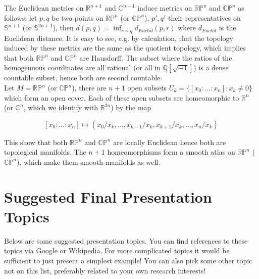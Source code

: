 \documentclass{article}
\theoremstyle{definition}
\begin{document}
The Euclidean metrics on $\mathbb{R}^{n+1}$ and $\mathbb{C}^{n+1}$ induce metrics on $\mathbb{RP}^n$ and $\mathbb{CP}^n$ as follows: let $p, q$ be two points on $\mathbb{RP}^n$ (or $\mathbb{CP}^n$), $p', q'$ their representatives on $\mathbb{S}^{n+1}$ (or $\mathbb{S}^{2n+1}$), then $d(p, q)=\inf_{r\sim q}d_{Euclid}(p, r)$ where $d_{Euclid}$ is the Euclidean distance. It is easy to see, e.g. by calculation, that the topology induced by these metrics are the same as the quotient topology, which implies that both $\mathbb{RP}^n$ and $\mathbb{CP}^n$ are Hausdorff. The subset where the ratios of the homogenuous coordinates are all rational (or all in $\mathbb{Q}[\sqrt{-1}]$) is a dense countable subset, hence both are second countable.\\

Let $M=\mathbb{RP}^n$ (or $\mathbb{CP}^n$), there are $n+1$ open subsets $U_k=\{[x_0:\dots:x_n] : x_k\not=0\}$ which form an open cover. Each of these open subsets are homeomorphic to $\mathbb{R}^n$ (or $\mathbb{C}^n$, which we identify with $\mathbb{R}^{2n}$) by the map

\[[x_0:\dots:x_n]\mapsto (x_0/x_k, \dots, x_{k-1}/x_k, x_{k+1}/x_k, \dots, x_n/x_k)\]

This show that both $\mathbb{RP}^n$ and $\mathbb{CP}^n$ are locally Euclidean hence both are topological manifolds. The $n+1$ homeomorphisms form a smooth atlas on $\mathbb{RP}^n$ ($\mathbb{CP}^n$), which make them smooth manifolds as well.

\newpage

\section{Suggested Final Presentation Topics}

Below are some suggested presentation topics. You can find references to these topics via Google or Wikipedia. For more complicated topics it would be sufficient to just present a simplest example! You can also pick some other topic not on this list, preferably related to your own research interests!
\end{document}
